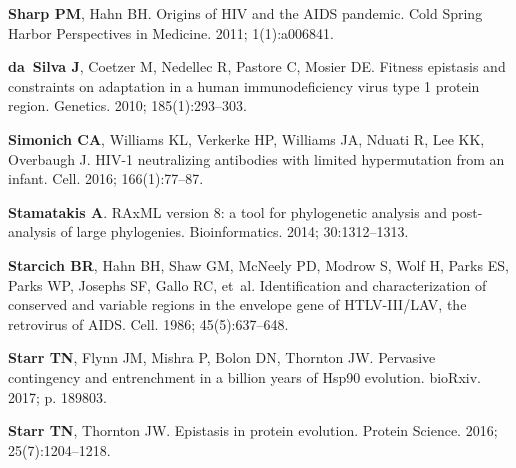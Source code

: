 \documentclass[9pt]{elife}
\begin{document}
\begin{thebibliography}{114}
\textbf{\color{eLifeMediumGrey} Sharp PM}, Hahn BH.
\newblock Origins of {HIV} and the {AIDS} pandemic.
\newblock Cold Spring Harbor Perspectives in Medicine.  2011; 1(1):a006841.

\textbf{\color{eLifeMediumGrey} da~Silva J}, Coetzer M, Nedellec R, Pastore C,
  Mosier DE.
\newblock Fitness epistasis and constraints on adaptation in a human
  immunodeficiency virus type 1 protein region.
\newblock Genetics.  2010; 185(1):293--303.

\textbf{\color{eLifeMediumGrey} Simonich CA}, Williams KL, Verkerke HP,
  Williams JA, Nduati R, Lee KK, Overbaugh J.
\newblock HIV-1 neutralizing antibodies with limited hypermutation from an
  infant.
\newblock Cell.  2016; 166(1):77--87.

\textbf{\color{eLifeMediumGrey} Stamatakis A}.
\newblock RAxML version 8: a tool for phylogenetic analysis and post-analysis
  of large phylogenies.
\newblock Bioinformatics.  2014; 30:1312--1313.

\textbf{\color{eLifeMediumGrey} Starcich BR}, Hahn BH, Shaw GM, McNeely PD,
  Modrow S, Wolf H, Parks ES, Parks WP, Josephs SF, Gallo RC, et~al.
\newblock Identification and characterization of conserved and variable regions
  in the envelope gene of HTLV-III/LAV, the retrovirus of AIDS.
\newblock Cell.  1986; 45(5):637--648.

\textbf{\color{eLifeMediumGrey} Starr TN}, Flynn JM, Mishra P, Bolon DN,
  Thornton JW.
\newblock Pervasive contingency and entrenchment in a billion years of Hsp90
  evolution.
\newblock bioRxiv.  2017; p. 189803.

\textbf{\color{eLifeMediumGrey} Starr TN}, Thornton JW.
\newblock Epistasis in protein evolution.
\newblock Protein Science.  2016; 25(7):1204--1218.


\end{thebibliography}
\end{document}
